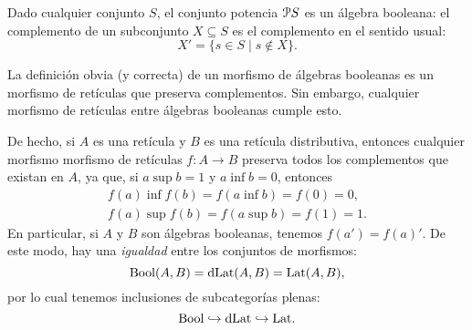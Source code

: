 \iffalse
La unicidad de los complementos en un álgebra booleana se debe
a la distributividad. En efecto, si $a\in A$ es un elemento con
complementos $b_1,b_2$, entonces tenemos
  \begin{align*}
    a\wedge b_1&=0 & a\vee b_1&=1 \\
    a\wedge b_2&=0 & a\vee b_2&=1.
  \end{align*}
  Por distributividad, tenemos
  \[
    b_1
    =b_1\vee 0
    =b_1\vee (a\wedge b_2)
    =(b_1\vee a)\wedge (b_1\vee b_2)
    =1\wedge (b_1\vee b_2)
    =b_1\vee b_2
  \]
  por lo cual $b_2\leq b_1$.
  Similarmente,
  \[
    b_2
    =b_2\vee 0
    =b_2\vee (a \wedge b_1)
    =(b_2\vee a)\wedge (b_2\vee b_1)
    =1\wedge (b_2\vee b_1)
    =b_2\vee b_1
  \]
  por lo cual $b_1\leq b_2$.
  Así, $b_1=b_2$.
\fi

\begin{example}
    Dado cualquier conjunto $S$, el conjunto potencia $\cal PS$ es un
    álgebra booleana: el complemento de un subconjunto $X\subseteq S$
    es el complemento en el sentido usual:
    \[
      X' = \{s\in S \mid s\not\in X\}
    .\]
\end{example}

\begin{remark}\label{obs:bool-plena-en-dlat}
La definición obvia (y correcta) de un morfismo de álgebras booleanas
es un morfismo de retículas que preserva complementos. Sin embargo,
cualquier morfismo de retículas entre álgebras booleanas cumple esto.

De hecho, si $A$ es una retícula y $B$ es una retícula distributiva,
entonces cualquier morfismo morfismo de retículas $f:A\to B$ preserva
todos los complementos que existan en $A$, ya que, si $a\sup b=1$
y $a\inf b=0$, entonces
\begin{align*}
  f(a)\inf f(b)=f(a\inf b)=f(0)=0, \\
  f(a)\sup f(b)=f(a\sup b)=f(1)=1.
\end{align*} 
En particular, si $A$ y $B$ son álgebras booleanas, tenemos
$f(a')=f(a)'$.
De este modo, hay una \emph{igualdad} entre los conjuntos de
morfismos:
\[
  \Bool(A,B) = \DLat(A,B) = \Lat(A,B)
,\]
por lo cual tenemos inclusiones de subcategorías plenas:
\begin{equation}
  \Bool \rmono \DLat \rmono \Lat.
\end{equation}
\end{remark}

